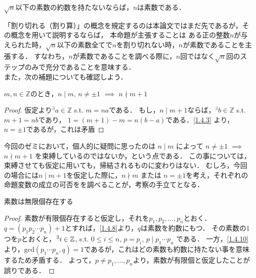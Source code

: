     \begin{prop} \label{1.4.9.1}
      $\sqrt{n}$以下の素数の約数を持たないならば，$n$は素数である．
    \end{prop}

    「割り切れる（割り算）」の概念を規定するのは本論文ではまだ先であるが，その概念を用いて説明するならば，
    本命題が主張することは ある正の整数$n$が与えられた時，$\sqrt{n}$以下の素数全てで$n$を割り切れない時，$n$が素数であることを主張する．
    すなわち，$n$が素数であることを調べる際に，$n$回ではなく$\sqrt{n}$回のステップのみで充分であることを意味する． \\

    また，次の補題についても確認しよう．

    \begin{lem} \label{1.4.10}
      $m, n \in \mathbb{Z}$のとき，$n \mid m$, $n \neq \pm 1$ $\implies$ $n \nmid m + 1$
    \end{lem}

    \begin{proof}
      仮定より$^{\exists}a \in \mathbb{Z}$ s.t. $m = na$である．
      もし，$n \mid m+1$ならば，$^{\exists}b \in \mathbb{Z}$ s.t. $m+1 = nb$であり，
      $1 = (m+1)-m = n(b-a)$である．\cref{1.4.3} より，$n = \pm 1$であるが，これは矛盾
    \end{proof}

    今回のゼミにおいて，個人的に疑問に思ったのは $n \mid m$ によって $n \neq \pm 1$ $\implies$ $n \nmid m + 1$ を束縛しているのではないか，という点である．
    この事については，束縛させても仮定に用いても，帰結されるものに変わりはない．
    むしろ，今回の場合には$n \mid m+1$を仮定した際に，$n \nmid m$ または $n = \pm 1$を考え，それぞれの命題変数の成立の可否をを調べることが，考察の手立てとなる．

    \begin{prop} \label{1.4.11}
      素数は無限個存在する
    \end{prop}

    \begin{proof}
      素数が有限個存在すると仮定し，それを$p_1, p_2, ... , p_n $とおく．
      $q=(p_1 p_2 \cdots p_n) + 1$とすれば，\cref{1.4.8}より，$q$は素数を約数にもつ．
      その素数の1つを$p$とおくと，$^{\exists}i \in \mathbb{Z}$, s.t. $0 \leq i \leq n$, $p = p_i$, $p \mid p_1 \cdots p_n$ である．
      一方，\cref{1.4.10}より，$\mathrm{gcd} (p_1 \cdots p_n, q)=1$であるが，これはどの素数も約数に持たない事を意味するため矛盾する．
      よって，$p \neq p_1, ... , p_n$より，素数が有限個と仮定したことが誤りである．
    \end{proof}

